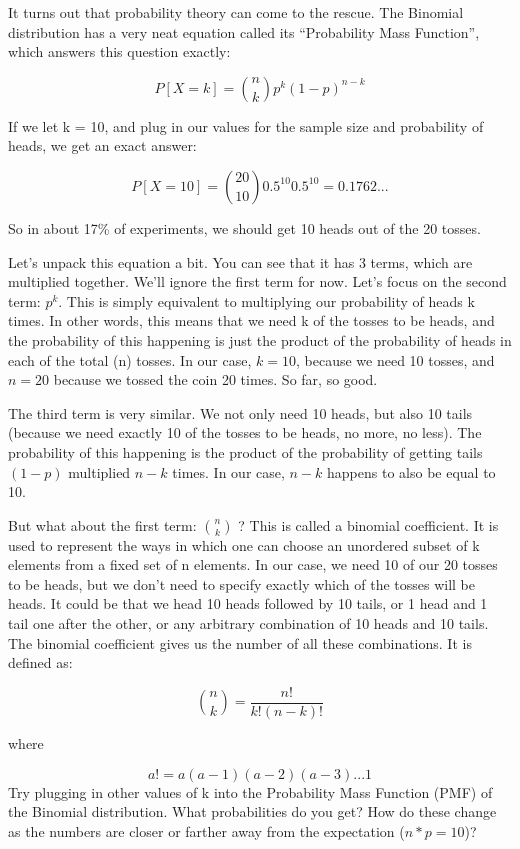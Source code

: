 \documentclass[
]{book}
\begin{document}
It turns out that probability theory can come to the rescue. The Binomial distribution has a very neat equation called its ``Probability Mass Function'', which answers this question exactly:

\[P[ X = k ] = {n \choose k}p^{k}(1-p)^{n-k}\]

If we let k = 10, and plug in our values for the sample size and probability of heads, we get an exact answer:

\[P[ X = 10 ] = {20 \choose 10}0.5^{10}0.5^{10} = 0.1762...\]

So in about 17\% of experiments, we should get 10 heads out of the 20 tosses.

Let's unpack this equation a bit. You can see that it has 3 terms, which are multiplied together. We'll ignore the first term for now. Let's focus on the second term: \(p^{k}\). This is simply equivalent to multiplying our probability of heads k times. In other words, this means that we need k of the tosses to be heads, and the probability of this happening is just the product of the probability of heads in each of the total (n) tosses. In our case, \(k=10\), because we need 10 tosses, and \(n=20\) because we tossed the coin 20 times. So far, so good.

The third term is very similar. We not only need 10 heads, but also 10 tails (because we need exactly 10 of the tosses to be heads, no more, no less). The probability of this happening is the product of the probability of getting tails \((1-p)\) multiplied \(n-k\) times. In our case, \(n-k\) happens to also be equal to 10.

But what about the first term: \(n \choose k\) ? This is called a binomial coefficient. It is used to represent the ways in which one can choose an unordered subset of k elements from a fixed set of n elements. In our case, we need 10 of our 20 tosses to be heads, but we don't need to specify exactly which of the tosses will be heads. It could be that we head 10 heads followed by 10 tails, or 1 head and 1 tail one after the other, or any arbitrary combination of 10 heads and 10 tails. The binomial coefficient gives us the number of all these combinations. It is defined as:

\[{n \choose k} = \frac{n!}{k!(n-k)!}\]

where

\[a! = a(a-1)(a-2)(a-3) ...1\]
Try plugging in other values of k into the Probability Mass Function (PMF) of the Binomial distribution. What probabilities do you get? How do these change as the numbers are closer or farther away from the expectation (\(n*p=10\))?
\end{document}
